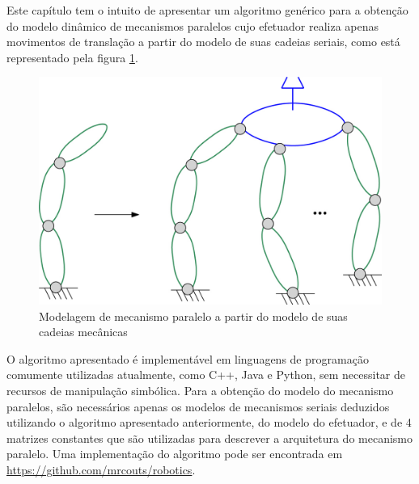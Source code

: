 \documentclass[]{politex}
\begin{document}
Este capítulo tem o intuito de apresentar um algoritmo genérico para a obtenção do modelo dinâmico de mecanismos paralelos cujo efetuador realiza apenas movimentos de translação a partir do modelo de suas cadeias seriais, como está representado pela figura \ref{fig:AcoplamentoMecParaleloFig}. 
\begin{figure}[h]
	\centering
	\includegraphics[scale=1.0]{imagens/Serial2Paralelo.jpg}  
	\caption{Modelagem de mecanismo paralelo a partir do modelo de suas cadeias mecânicas}
	\label{fig:AcoplamentoMecParaleloFig}
\end{figure}

O algoritmo apresentado é implementável em linguagens de programação comumente utilizadas atualmente, como C++, Java e Python, sem necessitar de recursos de manipulação simbólica. Para a obtenção do modelo do mecanismo paralelos, são necessários apenas os modelos de mecanismos seriais deduzidos  utilizando o algoritmo apresentado anteriormente, do modelo do efetuador, e de 4 matrizes constantes que são utilizadas para descrever a arquitetura do mecanismo paralelo.  Uma implementação do algoritmo pode ser encontrada em \url{https://github.com/mrcouts/robotics}.
\end{document}

